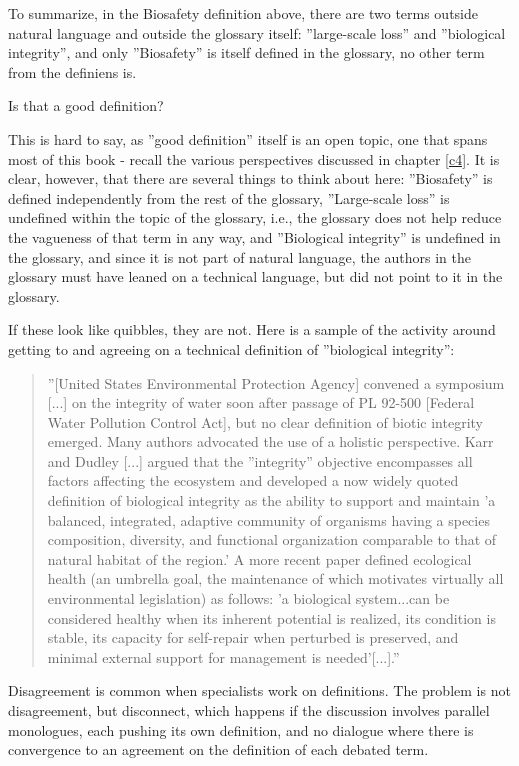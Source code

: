 \documentclass[graybox,envcountchap,sectrefs]{svmono}
\begin{document}
To summarize, in the Biosafety definition above, there are two terms outside natural language and outside the glossary itself: ''large-scale loss'' and ''biological integrity'', and only ''Biosafety'' is itself defined in the glossary, no other term from the definiens is.

Is that a good definition?

This is hard to say, as ''good definition'' itself is an open topic, one that spans most of this book - recall the various perspectives discussed in chapter \ref{c4}. It is clear, however, that there are several things to think about here:
''Biosafety'' is defined independently from the rest of the glossary,
''Large-scale loss'' is undefined within the topic of the glossary, i.e., the glossary does not help reduce the vagueness of that term in any way, and
''Biological integrity'' is undefined in the glossary, and since it is not part of natural language, the authors in the glossary must have leaned on a technical language, but did not point to it in the glossary.

If these look like quibbles, they are not. Here is a sample of the activity around getting to and agreeing on a technical definition of ''biological integrity'':

\begin{quote}
''[United States Environmental Protection Agency] convened a symposium [...] on the integrity of water soon after passage of PL 92-500 [Federal Water Pollution Control Act], but no clear definition of biotic integrity emerged. Many authors advocated the use of a holistic perspective. Karr and Dudley [...] argued that the ''integrity'' objective encompasses all factors affecting the ecosystem and developed a now widely quoted definition of biological integrity as the ability to support and maintain 'a balanced, integrated, adaptive community of organisms having a species composition, diversity, and functional organization comparable to that of natural habitat of the region.' A more recent paper defined ecological health (an umbrella goal, the maintenance of which motivates virtually all environmental legislation) as follows: 'a biological system...can be considered healthy when its inherent potential is realized, its condition is stable, its capacity for self-repair when perturbed is preserved, and minimal external support for management is needed'[...].'' \cite{karr1991biological}
\end{quote}

Disagreement is common when specialists work on definitions. The problem is not disagreement, but disconnect, which happens if the discussion involves parallel monologues, each pushing its own definition, and no dialogue where there is convergence to an agreement on the definition of each debated term.
\end{document}
